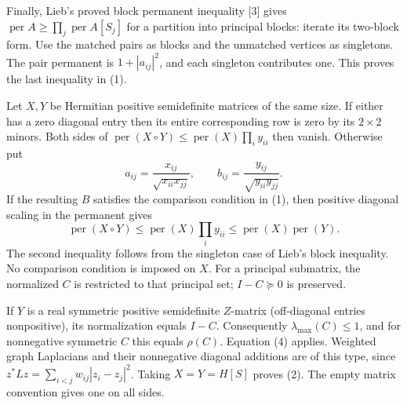 \documentclass[11pt]{article}
\newcommand{\shead}[1]{\par\vspace{4pt}{\large\bfseries\sffamily\color{ink}#1}\par}
\newcommand{\per}{\operatorname{per}}
\begin{document}
Finally, Lieb's proved block permanent inequality [3] gives $\per A\ge\prod_j\per A[S_j]$ for a partition into principal blocks: iterate its two-block form. Use the matched pairs as blocks and the unmatched vertices as singletons. The pair permanent is $1+|a_{ij}|^2$, and each singleton contributes one. This proves the last inequality in (1).
\newpage
\shead{3. Undoing the normalization}
Let $X,Y$ be Hermitian positive semidefinite matrices of the same size. If either has a zero diagonal entry then its entire corresponding row is zero by its $2\times2$ minors. Both sides of $\per(X\circ Y)\le\per(X)\prod_i y_{ii}$ then vanish. Otherwise put
\[
 a_{ij}=\frac{x_{ij}}{\sqrt{x_{ii}x_{jj}}},\qquad
 b_{ij}=\frac{y_{ij}}{\sqrt{y_{ii}y_{jj}}}.
\]
If the resulting $B$ satisfies the comparison condition in (1), then positive diagonal scaling in the permanent gives
\begin{equation}
 \per(X\circ Y)\le\per(X)\prod_i y_{ii}\le\per(X)\per(Y).
\end{equation}
The second inequality follows from the singleton case of Lieb's block inequality. No comparison condition is imposed on $X$. For a principal submatrix, the normalized $C$ is restricted to that principal set; $I-C\succeq0$ is preserved.

If $Y$ is a real symmetric positive semidefinite $Z$-matrix (off-diagonal entries nonpositive), its normalization equals $I-C$. Consequently $\lambda_{\max}(C)\le1$, and for nonnegative symmetric $C$ this equals $\rho(C)$. Equation (4) applies. Weighted graph Laplacians and their nonnegative diagonal additions are of this type, since $z^*Lz=\sum_{i<j} w_{ij}|z_i-z_j|^2$. Taking $X=Y=H[S]$ proves (2). The empty matrix convention gives one on all sides.
\end{document}
